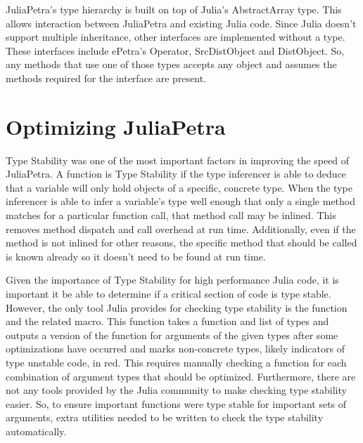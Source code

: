 \documentclass{article}
\newcommand{\juliaSnippet}[1]{\texttt{\detokenize{#1}}}
\begin{document}
JuliaPetra's type hierarchy is built on top of Julia's AbstractArray type.  This allows
interaction between JuliaPetra and existing Julia code.
Since Julia doesn't support multiple inheritance, %
other interfaces are implemented without a type.
These interfaces include ePetra's Operator, SrcDistObject and DistObject.
So, any methods that use one of those types accepts any object and assumes
the methods required for the interface are present.

\section{Optimizing JuliaPetra}

Type Stability was one of the most important factors in improving the speed of JuliaPetra.
A function is Type Stability if the type inferencer is able to deduce that a variable will only
hold objects of a specific, concrete type.
When the type inferencer is able to infer a variable's type well enough that only a single
method matches for a particular function call, that method call may be inlined. \cite{JuliaDesignPaper}
This removes method dispatch and call overhead at run time.
Additionally, even if the method is not inlined for other reasons, the specific method that should
be called is known already so it doesn't need to be found at run time.

Given the importance of Type Stability for high performance Julia code, it is important it be able
to determine if a critical section of code is type stable.
However, the only tool Julia provides for checking type stability is the \juliaSnippet{code_warntype}
function and the related \juliaSnippet{@code_warntype} macro.  This function takes a function and list
of types and outputs a version of the function for arguments of the given types after some optimizations
have occurred and marks non-concrete types, likely indicators of type unstable code, in red.
This requires manually checking a function for each combination of argument types that should be optimized.
Furthermore, there are not any tools provided by the Julia community to make checking type stability easier.
So, to ensure important functions were type stable for important sets of arguments,
extra utilities needed to be written to check the type stability automatically.
\end{document}
